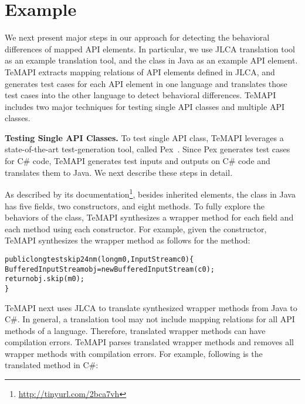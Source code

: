 \section{Example}
\label{sec:example}

We next present major steps in our approach for detecting the behavioral differences of mapped API elements. In particular, we use JLCA translation tool as an example translation tool, and the  class in Java as an example API element. TeMAPI extracts mapping relations of API elements defined in JLCA, and generates test cases for each API element in one language and translates those test cases into the other language to detect behavioral differences. TeMAPI includes two major techniques for testing single API classes and multiple API classes.

\textbf{Testing Single API Classes.} To test single API class, TeMAPI leverages a state-of-the-art test-generation tool, called Pex~\cite{tillmann2008pex}. Since Pex generates test cases for C\# code, TeMAPI generates test inputs and outputs on C\# code and translates them to Java. We next describe these steps in detail.

As described by its documentation\footnote{\url{http://tinyurl.com/2bca7vh}}, besides inherited elements, the  class in Java has five fields, two constructors, and eight methods. To fully explore the behaviors of the class, TeMAPI synthesizes a wrapper method for each field and each method using each constructor. For example, given the  constructor, TeMAPI synthesizes the wrapper method as follows for the  method:

\begin{CodeOut}\vspace*{-1ex}
\begin{alltt}
public long testskip24nm(long m0,InputStream c0)\{
  BufferedInputStream obj = new BufferedInputStream(c0);
  return obj.skip(m0);
\}
\end{alltt}
\end{CodeOut}\vspace*{-2ex}

TeMAPI next uses JLCA to translate synthesized wrapper methods from Java to C\#. In general, a translation tool may not include mapping relations for all API methods of a language. Therefore, translated wrapper methods can have compilation errors. TeMAPI parses translated wrapper methods and removes all wrapper methods with compilation errors. For example, following is the translated  method in C\#:

